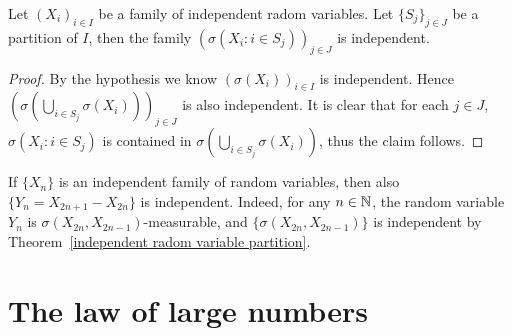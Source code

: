 \begin{theorem}\label{independent radom variable partition}
Let $(X_i)_{i\in I}$ be a family of independent radom variables. Let $\{S_j\}_{j\in J}$ be a partition of $I$, then the family $(\sigma(X_i:i\in S_j))_{j\in J}$ is independent.
\end{theorem}
\begin{proof}
By the hypothesis we know $(\sigma(X_i))_{i\in I}$ is independent. Hence $(\sigma(\bigcup_{i\in S_j}\sigma(X_i)))_{j\in J}$ is also independent. It is clear that for each $j\in J$, $\sigma(X_i:i\in S_j)$ is contained in $\sigma(\bigcup_{i\in S_j}\sigma(X_i))$, thus the claim follows.
\end{proof}
\begin{example}
If $\{X_n\}$ is an independent family of random variables, then also $\{Y_n=X_{2n+1}-X_{2n}\}$ is independent. Indeed, for any $n\in\mathbb{N}$, the random variable $Y_n$ is $\sigma(X_{2n},X_{2n-1})$-measurable, and $\{\sigma(X_{2n},X_{2n-1})\}$ is independent by Theorem~\ref{independent radom variable partition}.
\end{example}
\section{The law of large numbers}
